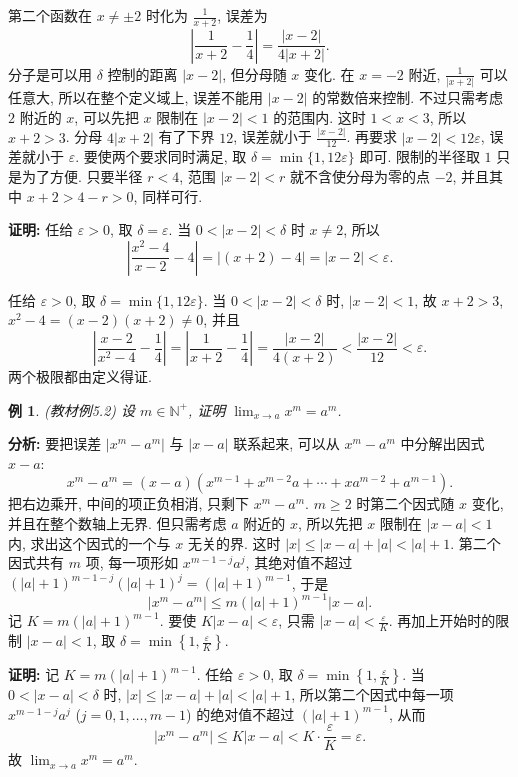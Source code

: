 \documentclass[UTF8,openany]{ctexbook}
\theoremstyle{chinesetextbook}
\newtheorem{example}{例}[section]
\newenvironment{cnproof}{\par\indent\textbf{证明:} \ignorespaces}{\par}
\begin{document}
第二个函数在 $x\ne\pm2$ 时化为 $\displaystyle\frac1{x+2}$, 误差为
\[
\left|\frac1{x+2}-\frac14\right|=\frac{|x-2|}{4|x+2|}.
\]
分子是可以用 $\delta$ 控制的距离 $|x-2|$, 但分母随 $x$ 变化. 在 $x=-2$ 附近, $\displaystyle\frac1{|x+2|}$ 可以任意大, 所以在整个定义域上, 误差不能用 $|x-2|$ 的常数倍来控制. 不过只需考虑 $2$ 附近的 $x$, 可以先把 $x$ 限制在 $|x-2|<1$ 的范围内. 这时 $1<x<3$, 所以 $x+2>3$. 分母 $4|x+2|$ 有了下界 $12$, 误差就小于 $\displaystyle\frac{|x-2|}{12}$. 再要求 $|x-2|<12\varepsilon$, 误差就小于 $\varepsilon$. 要使两个要求同时满足, 取 $\delta=\min\{1,12\varepsilon\}$ 即可. 限制的半径取 $1$ 只是为了方便. 只要半径 $r<4$, 范围 $|x-2|<r$ 就不含使分母为零的点 $-2$, 并且其中 $x+2>4-r>0$, 同样可行.
\begin{cnproof}
任给 $\varepsilon>0$, 取 $\delta=\varepsilon$. 当 $0<|x-2|<\delta$ 时 $x\ne2$, 所以
\[
\left|\frac{x^2-4}{x-2}-4\right|=|(x+2)-4|=|x-2|<\varepsilon.
\]

任给 $\varepsilon>0$, 取 $\delta=\min\{1,12\varepsilon\}$. 当 $0<|x-2|<\delta$ 时, $|x-2|<1$, 故 $x+2>3$, $x^2-4=(x-2)(x+2)\ne0$, 并且
\[
\left|\frac{x-2}{x^2-4}-\frac14\right|=\left|\frac1{x+2}-\frac14\right|=\frac{|x-2|}{4(x+2)}<\frac{|x-2|}{12}<\varepsilon.
\]
两个极限都由定义得证.
\end{cnproof}
\begin{example}\label{ex:5-2}
\textnormal{(教材例5.2)} 设 $m\in\mathbb N^+$, 证明 $\displaystyle\lim_{x\to a}x^m=a^m$.
\end{example}
\par\indent\textbf{分析:} 要把误差 $|x^m-a^m|$ 与 $|x-a|$ 联系起来, 可以从 $x^m-a^m$ 中分解出因式 $x-a$:
\[
x^m-a^m=(x-a)\left(x^{m-1}+x^{m-2}a+\cdots+xa^{m-2}+a^{m-1}\right).
\]
把右边乘开, 中间的项正负相消, 只剩下 $x^m-a^m$. $m\ge2$ 时第二个因式随 $x$ 变化, 并且在整个数轴上无界. 但只需考虑 $a$ 附近的 $x$, 所以先把 $x$ 限制在 $|x-a|<1$ 内, 求出这个因式的一个与 $x$ 无关的界. 这时 $|x|\le|x-a|+|a|<|a|+1$. 第二个因式共有 $m$ 项, 每一项形如 $x^{m-1-j}a^j$, 其绝对值不超过 $(|a|+1)^{m-1-j}(|a|+1)^j=(|a|+1)^{m-1}$, 于是
\[
|x^m-a^m|\le m(|a|+1)^{m-1}|x-a|.
\]
记 $K=m(|a|+1)^{m-1}$. 要使 $K|x-a|<\varepsilon$, 只需 $\displaystyle|x-a|<\frac\varepsilon K$. 再加上开始时的限制 $|x-a|<1$, 取 $\displaystyle\delta=\min\left\{1,\frac\varepsilon K\right\}$.
\begin{cnproof}
记 $K=m(|a|+1)^{m-1}$. 任给 $\varepsilon>0$, 取 $\displaystyle\delta=\min\left\{1,\frac\varepsilon K\right\}$. 当 $0<|x-a|<\delta$ 时, $|x|\le|x-a|+|a|<|a|+1$, 所以第二个因式中每一项 $x^{m-1-j}a^j$ ($j=0,1,\ldots,m-1$) 的绝对值不超过 $(|a|+1)^{m-1}$, 从而
\[
|x^m-a^m|\le K|x-a|<K\cdot\frac\varepsilon K=\varepsilon.
\]
故 $\displaystyle\lim_{x\to a}x^m=a^m$.
\end{cnproof}
\end{document}
